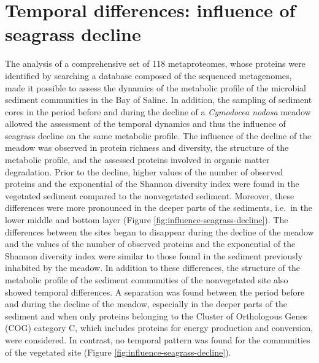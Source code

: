 \documentclass[
  12 pt,
]{book}
\begin{document}
\hypertarget{section-temporal-differences}{%
\section{Temporal differences: influence of seagrass decline}\label{section-temporal-differences}}

The analysis of a comprehensive set of 118 metaproteomes, whose proteins were identified by searching a database composed of the sequenced metagenomes, made it possible to assess the dynamics of the metabolic profile of the microbial sediment communities in the Bay of Saline. In addition, the sampling of sediment cores in the period before and during the decline of a \emph{Cymodocea nodosa} meadow allowed the assessment of the temporal dynamics and thus the influence of seagrass decline on the same metabolic profile. The influence of the decline of the meadow was observed in protein richness and diversity, the structure of the metabolic profile, and the assessed proteins involved in organic matter degradation. Prior to the decline, higher values of the number of observed proteins and the exponential of the Shannon diversity index were found in the vegetated sediment compared to the nonvegetated sediment. Moreover, these differences were more pronounced in the deeper parts of the sediments, i.e.~in the lower middle and bottom layer (Figure \ref{fig:influence-seagrass-decline}). The differences between the sites began to disappear during the decline of the meadow and the values of the number of observed proteins and the exponential of the Shannon diversity index were similar to those found in the sediment previously inhabited by the meadow. In addition to these differences, the structure of the metabolic profile of the sediment communities of the nonvegetated site also showed temporal differences. A separation was found between the period before and during the decline of the meadow, especially in the deeper parts of the sediment and when only proteins belonging to the Cluster of Orthologous Genes (COG) category C, which includes proteins for energy production and conversion, were considered. In contrast, no temporal pattern was found for the communities of the vegetated site (Figure \ref{fig:influence-seagrass-decline}).
\newpage
\end{document}
